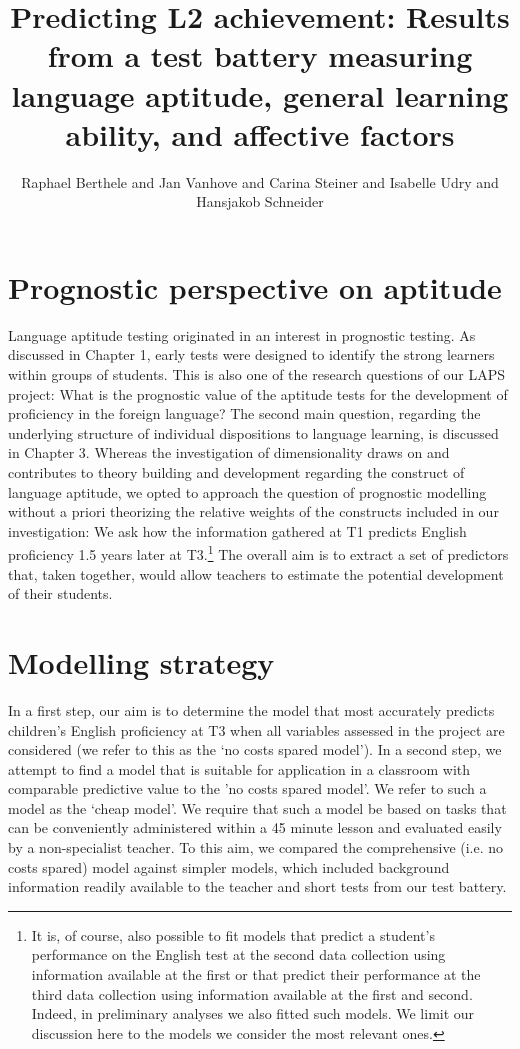 \documentclass[output=paper]{langsci/langscibook}
\author{Raphael Berthele\orcid{}\affiliation{University of Fribourg, Institut de Plurilinguisme} and Jan Vanhove\orcid{}\affiliation{University of Fribourg, Institut de Plurilinguisme} and Carina Steiner\orcid{}\affiliation{University of Berne, Center for the Study of Language and Society} and Isabelle Udry\orcid{}\affiliation{University of Fribourg, Institut de Plurilinguisme; Zurich University of Teacher Education} and Hansjakob Schneider\orcid{}\affiliation{Zurich University of Teacher Education}}
\title[Predicting L2 achievement]
      {Predicting L2 achievement: Results from a test battery measuring language aptitude, general learning ability, and affective factors}
\begin{document}
\maketitle \label{ch:4}


\section{Prognostic perspective on aptitude}

Language aptitude testing originated in an interest in prognostic testing. As discussed in Chapter 1, early tests were designed to identify the strong learners within groups of students. This is also one of the research questions of our LAPS project: What is the prognostic value of the aptitude tests for the development of proficiency in the foreign language? The second main question, regarding the underlying structure of individual dispositions to language learning, is discussed in Chapter 3.  Whereas the investigation of dimensionality draws on and contributes to theory building and development regarding the construct of language aptitude, we opted to approach the question of prognostic modelling without a priori theorizing the relative weights of the constructs included in our investigation: We ask how the information gathered at T1 predicts English proficiency 1.5 years later at T3.\footnote{It is, of course, also possible to fit models that predict a student’s performance on the English test at the second data collection using information available at the first or that predict their performance at the third data collection using information available at the first and second. Indeed, in preliminary analyses we also fitted such models. We limit our discussion here to the models we consider the most relevant ones.} The overall aim is to extract a set of predictors that, taken together, would allow teachers to estimate the potential development of their students.

\section{Modelling strategy}

In a first step, our aim is to determine the model that most accurately predicts children’s English proficiency at T3 when all variables assessed in the project are considered (we refer to this as the ‘no costs spared model’). In a second step, we attempt to find a model that is suitable for application in a classroom with comparable predictive value to the 'no costs spared model'. We refer to such a model as the ‘cheap model’. We require that such a model be based on tasks that can be conveniently administered within a 45 minute lesson and evaluated easily by a non-specialist teacher. To this aim, we compared the comprehensive (i.e. no costs spared) model against simpler models, which included background information readily available to the teacher and short tests from our test battery.
\end{document}
